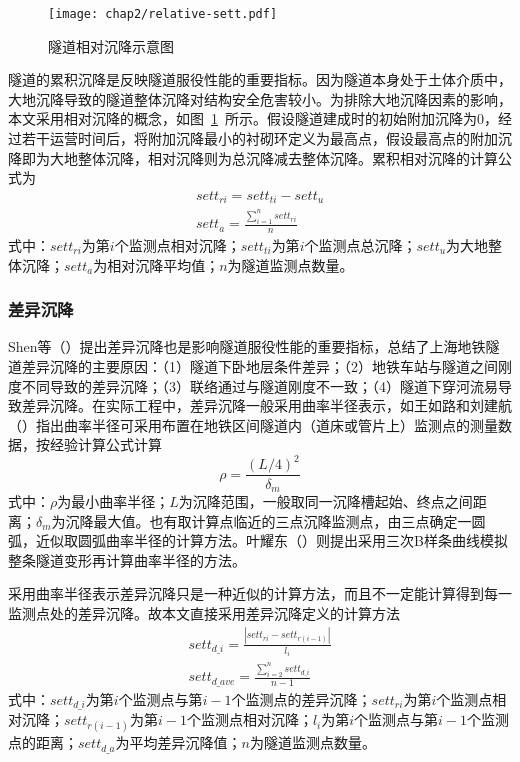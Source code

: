 \begin{figure}[htbp]
    \centering
    \texttt{[image: chap2/relative-sett.pdf]}
    \caption{隧道相对沉降示意图}
    \label{fig:隧道相对沉降示意图}
\end{figure}

隧道的累积沉降是反映隧道服役性能的重要指标。因为隧道本身处于土体介质中，大地沉降导致的隧道整体沉降对结构安全危害较小。为排除大地沉降因素的影响，本文采用相对沉降的概念，如图~\ref{fig:隧道相对沉降示意图}~所示。假设隧道建成时的初始附加沉降为0，经过若干运营时间后，将附加沉降最小的衬砌环定义为最高点，假设最高点的附加沉降即为大地整体沉降，相对沉降则为总沉降减去整体沉降。累积相对沉降的计算公式为
\begin{align}
    \label{equ:sett_r}
    {sett}_{ri}={sett}_{ti}-{sett}_{u} \\
    \label{equ:sett_ave}
    {sett}_{a}=\frac{\sum\limits_{i=1}^{n}{{sett}_{ri}}}{n}
\end{align}
式中：${sett}_{ri}$为第$i$个监测点相对沉降；${sett}_{ti}$为第$i$个监测点总沉降；${sett}_{u}$为大地整体沉降；${sett}_{a}$为相对沉降平均值；$n$为隧道监测点数量。

\subsubsection{差异沉降}

Shen等（\citeyear{shen2014long}）提出差异沉降也是影响隧道服役性能的重要指标，总结了上海地铁隧道差异沉降的主要原因：（1）隧道下卧地层条件差异；（2）地铁车站与隧道之间刚度不同导致的差异沉降；（3）联络通过与隧道刚度不一致；（4）隧道下穿河流易导致差异沉降。在实际工程中，差异沉降一般采用曲率半径表示，如王如路和刘建航（\citeyear{王如路2004上海地铁监护实践}）指出曲率半径可采用布置在地铁区间隧道内（道床或管片上）监测点的测量数据，按经验计算公式计算
\begin{equation}
    \label{equ:ratio1}
    \rho =\frac{{{(L/4)}^{2}}}{{{\delta }_{m}}}
\end{equation}
式中：$\rho$为最小曲率半径；$L$为沉降范围，一般取同一沉降槽起始、终点之间距离；${\delta }_{m}$为沉降最大值。也有取计算点临近的三点沉降监测点，由三点确定一圆弧，近似取圆弧曲率半径的计算方法。叶耀东（\citeyear{叶耀东2007软土地区运营地铁盾构隧道结构变形及健康诊断方法研究}）则提出采用三次B样条曲线模拟整条隧道变形再计算曲率半径的方法。

采用曲率半径表示差异沉降只是一种近似的计算方法，而且不一定能计算得到每一监测点处的差异沉降。故本文直接采用差异沉降定义的计算方法
\begin{align}
    \label{equ:diff_sett}
    set{{t}_{d\_i}}=\frac{\left| set{{t}_{ri}}-set{{t}_{r(i-1)}} \right|}{{{l}_{i}}} \\
    \label{equ:diff_sett_ave}
    set{{t}_{d\_ave}}=\frac{\sum\limits_{i=2}^{n}{set{{t}_{d\_i}}}}{n-1}
\end{align}
式中：$set{{t}_{d\_i}}$为第$i$个监测点与第$i-1$个监测点的差异沉降；$set{{t}_{ri}}$为第$i$个监测点相对沉降；$set{{t}_{r(i-1)}}$为第$i-1$个监测点相对沉降；${l}_{i}$为第$i$个监测点与第$i-1$个监测点的距离；$set{{t}_{d\_a}}$为平均差异沉降值；$n$为隧道监测点数量。

